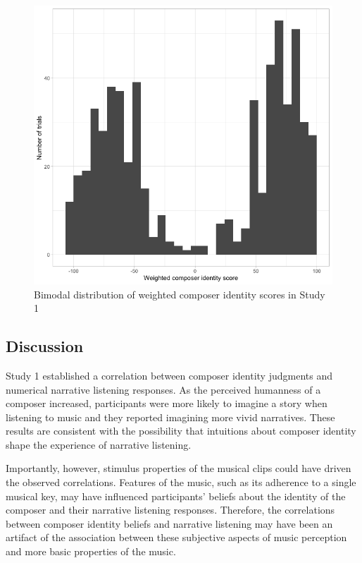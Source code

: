 \documentclass[12pt,twoside]{reedthesis}
\begin{document}
\begin{figure}[h!tbp]
	\centering
	\includegraphics[scale=0.4]{weighted_dist.png}
	\caption{Bimodal distribution of weighted composer identity scores in Study 1}
	\label{fig-bimodal-dist}
\end{figure}

\subsection*{Discussion}

Study 1 established a correlation between composer identity judgments and numerical narrative listening responses. As the perceived humanness of a composer increased, participants were more likely to imagine a story when listening to music and they reported imagining more vivid narratives. These results are consistent with the possibility that intuitions about composer identity shape the experience of narrative listening.

Importantly, however, stimulus properties of the musical clips could have driven the observed correlations. Features of the music, such as its adherence to a single musical key, may have influenced participants’ beliefs about the identity of the composer and their narrative listening responses. Therefore, the correlations between composer identity beliefs and narrative listening may have been an artifact of the association between these subjective aspects of music perception and more basic properties of the music.
\end{document}
